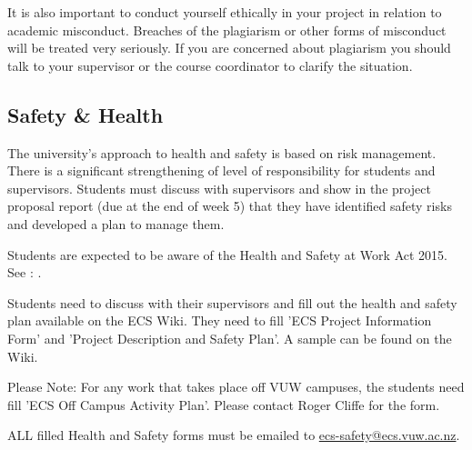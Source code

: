 It is also important to conduct yourself ethically in your project in relation to 
academic misconduct.  Breaches of the plagiarism or other forms of misconduct
will be treated very seriously. If you are concerned about plagiarism you 
should talk to your supervisor or the course coordinator to clarify the 
situation.

\subsection{Safety \& Health}
The university's approach to health and safety is based on risk management. 
There is a significant strengthening of level of responsibility for students and supervisors. 
Students must discuss with supervisors and show in the project proposal report 
(due at the end of week 5) that they have identified safety risks and developed a plan to manage them.

\noindent Students are expected to be aware of the Health and Safety at Work Act 2015. See : .

Students need to discuss with their supervisors and fill out the health and safety 
plan available on the ECS Wiki. They need to fill 'ECS Project Information Form' 
and 'Project Description and Safety Plan'. A sample can be found on the Wiki.

Please Note: For any work that takes place off VUW campuses, the students need fill 
'ECS Off Campus Activity Plan'. Please contact Roger Cliffe for the form.

ALL filled Health and Safety forms must be emailed to \href{mailto://ecs-safety@ecs.vuw.ac.nz}{ecs-safety@ecs.vuw.ac.nz}.
